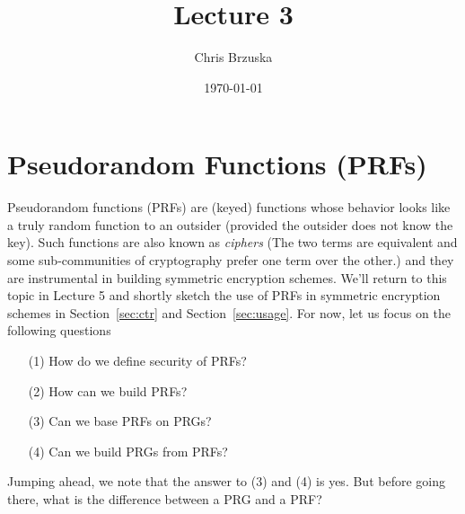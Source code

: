 \documentclass[a4paper,table,dvipsnames]{article}
\title{Lecture 3}
\author{Chris Brzuska}
\date{\today}
\theoremstyle{definition}
\begin{document}
\section{Pseudorandom Functions (PRFs)}
Pseudorandom functions (PRFs) are (keyed) functions whose behavior looks like a truly random function to an outsider (provided
the outsider does not know the key). Such functions are also known as \emph{ciphers} (The two terms are equivalent and
some sub-communities of cryptography prefer one term over the other.) and they are instrumental in building
symmetric encryption schemes. We'll return to this topic in Lecture 5 and shortly sketch the use of PRFs in symmetric encryption
schemes in Section~\ref{sec:ctr} and Section~\ref{sec:usage}. For now, let us focus on the following questions
\begin{itemize}
\item[(1)] How do we define security of PRFs?
\item[(2)] How can we build PRFs? 
\item[(3)] Can we base PRFs on PRGs?
\item[(4)] Can we build PRGs from PRFs?
\end{itemize}
Jumping ahead, we note that the answer to (3) and (4) is yes. But before going there, what
is the difference between a PRG and a PRF? 
\end{document}
